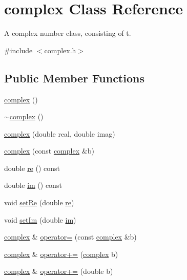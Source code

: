 \hypertarget{classcomplex}{}\section{complex Class Reference}
\label{classcomplex}


A complex number class, consisting of t.  




{\ttfamily \#include $<$complex.\+h$>$}

\subsection*{Public Member Functions}
\begin{DoxyCompactItemize}
\item 
\mbox{\hyperlink{classcomplex_a1fb8d3affbc54c1ad34a0820b357e194}{complex}} ()
\item 
\mbox{\hyperlink{classcomplex_abd31d1c53fe873fa4ec0fbce50601485}{$\sim$complex}} ()
\item 
\mbox{\hyperlink{classcomplex_ab8d6f234864954c1ab460984a1e32bd3}{complex}} (double real, double imag)
\item 
\mbox{\hyperlink{classcomplex_a57fa59491a94c3aeeb5b005fed5d0ed4}{complex}} (const \mbox{\hyperlink{classcomplex}{complex}} \&b)
\item 
double \mbox{\hyperlink{classcomplex_a696019188accc543e7c8297595e297ec}{re}} () const
\item 
double \mbox{\hyperlink{classcomplex_a450461dea92da7f72b96402edafd07c2}{im}} () const
\item 
void \mbox{\hyperlink{classcomplex_a360f0c3963a8e654ccbc16712294f4d7}{set\+Re}} (double \mbox{\hyperlink{classcomplex_a696019188accc543e7c8297595e297ec}{re}})
\item 
void \mbox{\hyperlink{classcomplex_aa4c37b87b5b9beebddad476b3049394c}{set\+Im}} (double \mbox{\hyperlink{classcomplex_a450461dea92da7f72b96402edafd07c2}{im}})
\item 
\mbox{\hyperlink{classcomplex}{complex}} \& \mbox{\hyperlink{classcomplex_a83c122535af669e7f331d71de550e9ba}{operator=}} (const \mbox{\hyperlink{classcomplex}{complex}} \&b)
\item 
\mbox{\hyperlink{classcomplex}{complex}} \& \mbox{\hyperlink{classcomplex_a8430406d485ddd82907b89aa38dfac18}{operator+=}} (\mbox{\hyperlink{classcomplex}{complex}} b)
\item 
\mbox{\hyperlink{classcomplex}{complex}} \& \mbox{\hyperlink{classcomplex_ae776ea1bee9bed9540597a671abc3953}{operator+=}} (double b)

\end{DoxyCompactItemize}
